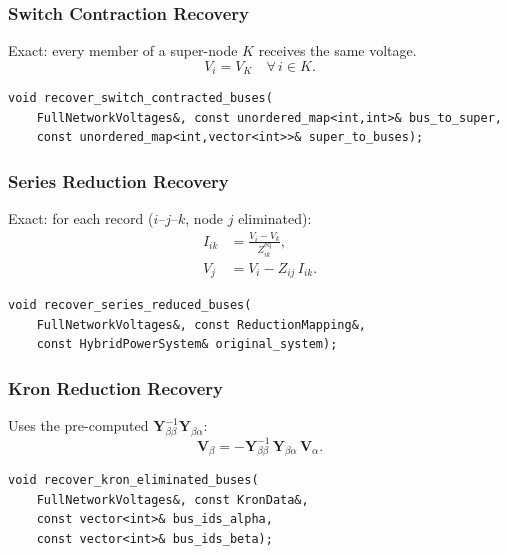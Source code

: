 \subsubsection{Switch Contraction Recovery}

Exact: every member of a super-node $K$ receives the same voltage.
\begin{equation}
  V_i = V_K \quad \forall\, i \in K.
  \label{eq:rec-switch}
\end{equation}

\begin{verbatim}
void recover_switch_contracted_buses(
    FullNetworkVoltages&, const unordered_map<int,int>& bus_to_super,
    const unordered_map<int,vector<int>>& super_to_buses);
\end{verbatim}

\subsubsection{Series Reduction Recovery}

Exact: for each record ($i$--$j$--$k$, node $j$ eliminated):
\begin{align}
  I_{ik} &= \frac{V_i - V_k}{Z_{ik}^{\text{eq}}}, \\
  V_j    &= V_i - Z_{ij}\,I_{ik}.
  \label{eq:rec-series}
\end{align}

\begin{verbatim}
void recover_series_reduced_buses(
    FullNetworkVoltages&, const ReductionMapping&,
    const HybridPowerSystem& original_system);
\end{verbatim}

\subsubsection{Kron Reduction Recovery}

Uses the pre-computed $\mathbf{Y}_{\beta\beta}^{-1}\mathbf{Y}_{\beta\alpha}$:
\begin{equation}
  \mathbf{V}_\beta = -\mathbf{Y}_{\beta\beta}^{-1}\,\mathbf{Y}_{\beta\alpha}\,
                      \mathbf{V}_\alpha.
  \label{eq:rec-kron}
\end{equation}

\begin{verbatim}
void recover_kron_eliminated_buses(
    FullNetworkVoltages&, const KronData&,
    const vector<int>& bus_ids_alpha,
    const vector<int>& bus_ids_beta);
\end{verbatim}

